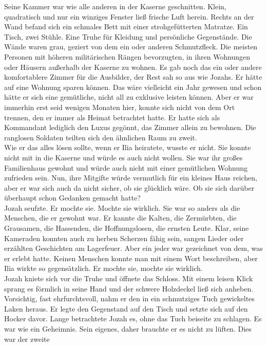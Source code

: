 Seine Kammer war wie alle anderen in der Kaserne geschnitten. Klein, quadratisch und nur ein 
winziges Fenster ließ frische Luft herein. Rechts an der Wand befand sich ein schmales Bett mit 
einer strohgefütterten Matratze. Ein Tisch, zwei Stühle. Eine Truhe für Kleidung und persönliche 
Gegenstände. Die Wände waren grau, geziert von dem ein oder anderen Schmutzfleck. Die meisten 
Personen mit höheren militärischen Rängen bevorzugten, in ihren Wohnungen oder Häusern außerhalb 
der Kaserne zu wohnen. Es gab noch das ein oder andere komfortablere Zimmer für die Ausbilder, der 
Rest sah so aus wie Jozahs. Er hätte auf eine Wohnung sparen können. Das wäre vielleicht ein Jahr 
gewesen und schon hätte er sich eine gemütliche, nicht all zu exklusive leisten können. Aber er war 
immerhin erst seid wenigen Monaten hier, konnte sich nicht von dem Ort trennen, den er immer als 
Heimat betrachtet hatte. Er hatte sich als Kommandant lediglich den Luxus gegönnt, das Zimmer 
allein zu bewohnen. Die ranglosen Soldaten teilten sich den ähnlichen Raum zu zweit. \\
Wie er das alles lösen sollte, wenn er Ilia heiratete, wusste er nicht. Sie konnte nicht mit in die 
Kaserne und würde es auch nicht wollen. Sie war ihr großes Familienhaus gewohnt und würde auch 
nicht mit einer gemütlichen Wohnung zufrieden sein. Nun, ihre Mitgifte würde vermutlich für ein 
kleines Haus reichen, aber er war sich auch da nicht sicher, ob sie glücklich wäre. Ob sie sich 
darüber überhaupt schon Gedanken gemacht hatte?\\
Jozah seufzte. Er mochte sie. Mochte sie wirklich. Sie war so anders als die Menschen, die er 
gewohnt war. Er kannte die Kalten, die Zermürbten, die Grausamen, die Hassenden, die 
Hoffnungslosen, die ernsten Leute. Klar, seine Kameraden konnten auch zu herben Scherzen fähig 
sein, sangen Lieder oder erzählten Geschichten am Lagerfeuer. Aber ein jeder war gezeichnet von dem, 
was er erlebt hatte. Keinen Menschen konnte man mit einem Wort beschreiben, aber Ilia wirkte so 
gegensätzlich. 
Er mochte sie, mochte sie wirklich.\\
Jozah kniete sich vor die Truhe und öffnete das Schloss. Mit einem leisen Klick sprang es förmlich 
in seine Hand und der schwere Holzdeckel ließ sich anheben. Vorsichtig, fast ehrfurchtsvoll, nahm 
er den in ein schmutziges Tuch gewickeltes Laken heraus. Er legte den Gegenstand auf den Tisch und 
setzte sich auf den Hocker davor. Lange betrachtete Jozah es, ohne das Tuch beiseite zu schlagen. 
Es war wie ein Geheimnis. Sein eigenes, daher brauchte er es nicht zu lüften. Dies war der zweite 

